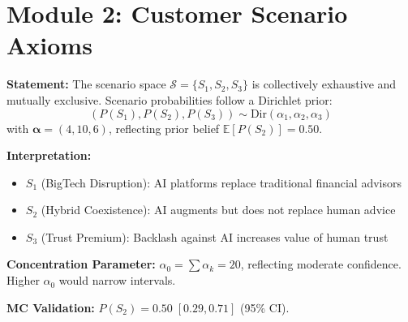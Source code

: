 \section{Module 2: Customer Scenario Axioms}
\label{sec:aim-m2}

\begin{tcolorbox}[colback=gray!5!white, colframe=gray!75!black,
    title=Axiom AIM-6: Scenario Exhaustiveness and Dirichlet Prior]
\label{ax:aim-6}

\textbf{Statement:}
The scenario space $\mathcal{S} = \{S_1, S_2, S_3\}$ is collectively exhaustive
and mutually exclusive. Scenario probabilities follow a Dirichlet prior:
\begin{equation}
(P(S_1), P(S_2), P(S_3)) \sim \text{Dir}(\alpha_1, \alpha_2, \alpha_3)
\label{eq:aim-dirichlet}
\end{equation}
with $\boldsymbol{\alpha} = (4, 10, 6)$, reflecting prior belief
$\mathbb{E}[P(S_2)] = 0.50$.

\textbf{Interpretation:}
\begin{itemize}[nosep]
\item $S_1$ (BigTech Disruption): AI platforms replace traditional financial advisors
\item $S_2$ (Hybrid Coexistence): AI augments but does not replace human advice
\item $S_3$ (Trust Premium): Backlash against AI increases value of human trust
\end{itemize}

\textbf{Concentration Parameter:} $\alpha_0 = \sum \alpha_k = 20$, reflecting
moderate confidence. Higher $\alpha_0$ would narrow intervals.

\textbf{MC Validation:} $P(S_2) = 0.50 \; [0.29, 0.71]$ (95\% CI).
\end{tcolorbox}


